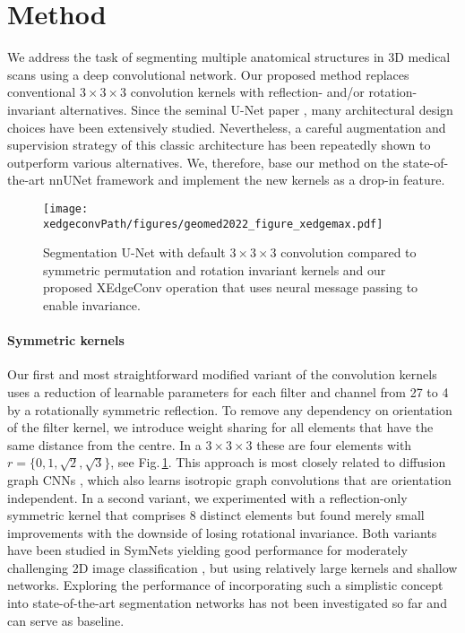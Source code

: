 \section{Method}
    We address the task of segmenting multiple anatomical structures in 3D medical scans using a deep convolutional network. Our proposed method replaces conventional $3\times3\times3$ convolution kernels with reflection- and/or rotation-invariant alternatives. Since the seminal U-Net paper \cite{ronneberger2015u}, many architectural design choices have been extensively studied. Nevertheless, a careful augmentation and supervision strategy of this classic architecture has been repeatedly shown to outperform various alternatives. We, therefore, base our method on the state-of-the-art nnUNet framework \cite{isensee2021nnu} and implement the new kernels as a drop-in feature.

    \begin{figure}
        \caption{
            Segmentation U-Net with default $3\times3\times3$  convolution compared to symmetric permutation and rotation invariant kernels  and our proposed XEdgeConv operation that uses neural message passing to enable invariance.
        }
        \label{fig:concept}
        \texttt{[image: \\xedgeconvPath/figures/geomed2022\_figure\_xedgemax.pdf]}
    \end{figure}
    \paragraph{Symmetric kernels} Our first and most straightforward modified variant of the convolution kernels  uses a reduction of learnable parameters for each filter and channel from 27 to 4 by a rotationally symmetric reflection. To remove any dependency on orientation of the filter kernel, we introduce weight sharing for all elements that have the same distance from the centre. In a $3\times3\times3$ these are four elements with $r=\{0,1,\sqrt{2},\sqrt{3}\}$, see Fig.\,\ref{fig:concept}. This approach is most closely related to diffusion graph CNNs \cite{atwood2016diffusion}, which also learns isotropic graph convolutions that are orientation independent. In a second variant, we experimented with a reflection-only symmetric kernel that comprises 8 distinct elements but found merely small improvements with the downside of losing rotational invariance. Both variants have been studied in SymNets yielding good performance for moderately challenging 2D image classification \cite{dzhezyan2021symmetrical}, but using relatively large kernels and shallow networks.
    Exploring the performance of incorporating such a simplistic concept into state-of-the-art segmentation networks has not been investigated so far and can serve as baseline.

